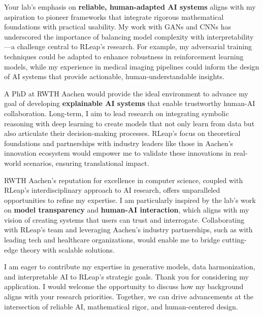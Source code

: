 \documentclass[11pt,a4paper, final]{moderncv}
\begin{document}
Your lab's emphasis on \textbf{reliable, human-adapted AI systems} 
aligns with my aspiration to pioneer frameworks that integrate rigorous mathematical foundations with practical usability. 
My work with GANs and CNNs has underscored the importance of balancing model complexity with interpretability—a challenge central to RLeap's research. 
For example, my adversarial training techniques could be adapted to enhance robustness in reinforcement learning models, 
while my experience in medical imaging pipelines could inform the design of AI systems 
that provide actionable, human-understandable insights.

A PhD at RWTH Aachen would provide the ideal environment to advance my goal of 
developing \textbf{explainable AI systems} that enable trustworthy human-AI collaboration. 
Long-term, I aim to lead research on integrating symbolic reasoning with deep learning to create models that not only learn from data but also articulate their decision-making processes. 
RLeap's focus on theoretical foundations and partnerships with industry leaders like those in Aachen's innovation ecosystem would empower me to validate these innovations in real-world scenarios, ensuring translational impact.

RWTH Aachen's reputation for excellence in computer science, coupled with RLeap's interdisciplinary approach to AI research, offers unparalleled opportunities to refine my expertise. 
I am particularly inspired by the lab's work on \textbf{model transparency} and \textbf{human-AI interaction}, 
which aligns with my vision of creating systems that users can trust and interrogate. 
Collaborating with RLeap's team and leveraging Aachen's industry partnerships, such as with leading tech and healthcare organizations, would enable me to bridge cutting-edge theory with scalable solutions.

I am eager to contribute my expertise in generative models, data harmonization, and interpretable AI to RLeap's strategic goals. 
Thank you for considering my application. I would welcome the opportunity to discuss how my background aligns with your research priorities. 
Together, we can drive advancements at the intersection of reliable AI, mathematical rigor, and human-centered design.

\makeletterclosing
\end{document}
